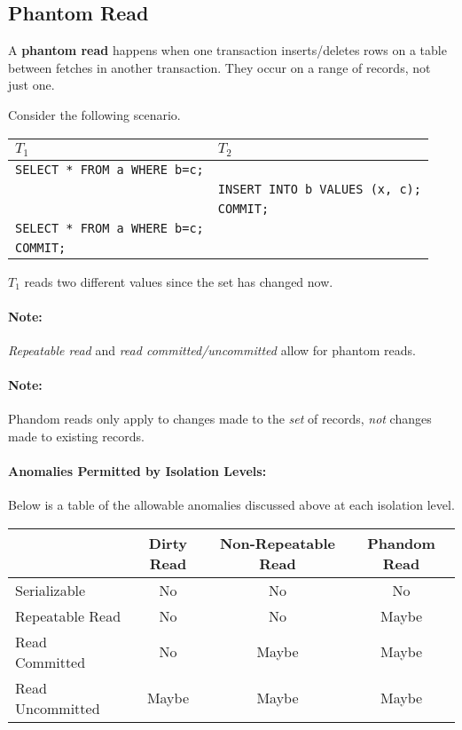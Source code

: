 \documentclass{report}
\newenvironment{definition}[1]{\begin{tcolorbox}[title={Definition: #1}]}{\end{tcolorbox}}
\newenvironment{example}{\begin{tcolorbox}[title={Example},colback=green!5!white,colframe=black!75!green]}{\end{tcolorbox}}
\renewcommand{\bf}[1]{\textbf{{#1}}}
\renewcommand{\tt}[1]{\texttt{{#1}}}
\renewcommand{\it}[1]{\textit{{#1}}}
\begin{document}
\subsection{Phantom Read}
\begin{definition}{Phantom Read}
    A \bf{phantom read} happens when one transaction inserts/deletes rows on a
    table between fetches in another transaction. They occur on a range of
    records, not just one.
\end{definition}

\begin{example}
    Consider the following scenario.

    {
        \centering
        \begin{tabular}{l|l}
            $T_1$ & $T_2$ \\
            \hline
            \tt{SELECT * FROM a WHERE b=c;} & \\
                            & \tt{INSERT INTO b VALUES (x, c);} \\
                            & \tt{COMMIT;} \\
            \tt{SELECT * FROM a WHERE b=c;} & \\
            \tt{COMMIT;} & \\
        \end{tabular}
        \par
    }

    $T_1$ reads two different values since the set has changed now.
\end{example}
\paragraph{Note:} \it{Repeatable read} and \it{read committed/uncommitted} allow
for phantom reads.

\paragraph{Note:} Phandom reads only apply to changes made to the \it{set} of
records, \it{not} changes made to existing records.

\paragraph{Anomalies Permitted by Isolation Levels:} Below is a table of the
allowable anomalies discussed above at each isolation level.

{
    \centering
    \begin{tabular}{l|c|c|c}
        & Dirty Read & Non-Repeatable Read & Phandom Read \\
        \hline
        Serializable & No & No & No \\
        Repeatable Read & No & No & Maybe \\
        Read Committed & No & Maybe & Maybe \\
        Read Uncommitted & Maybe & Maybe & Maybe \\
    \end{tabular}
    \par
}
\vspace{5em}
\end{document}
